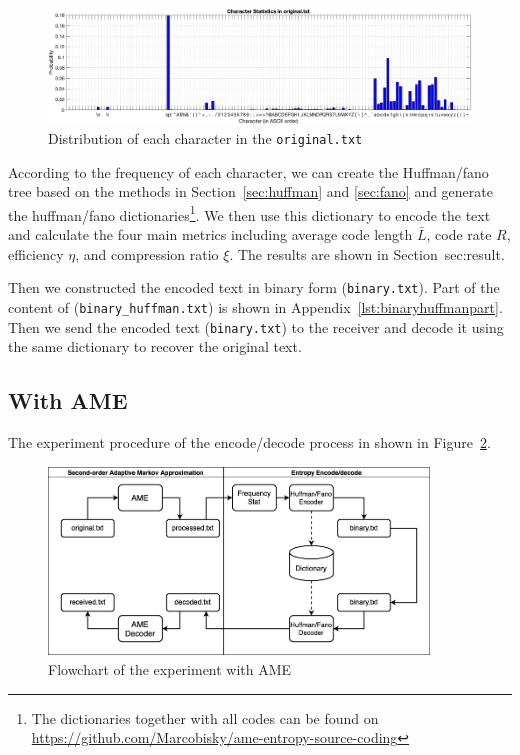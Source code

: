 \documentclass[12pt,twoside]{article}
\begin{document}
\begin{figure}[h!]
    \centering
    \includegraphics[width=\textwidth]{originalStat.png}
    \caption{Distribution of each character in the \texttt{original.txt}}
    \label{fig:originalStat}
\end{figure}

According to the frequency of each character, we can create the Huffman/fano tree based on the methods in Section~\ref{sec:huffman} and \ref{sec:fano} and generate the huffman/fano dictionaries\footnote{The dictionaries together with all codes can be found on \url{https://github.com/Marcobisky/ame-entropy-source-coding}}. We then use this dictionary to encode the text and calculate the four main metrics including average code length $\bar{L}$, code rate $R$, efficiency $\eta$, and compression ratio $\xi$. The results are shown in Section~{sec:result}. 

Then we constructed the encoded text in binary form (\texttt{binary.txt}). Part of the content of (\texttt{binary\_huffman.txt}) is shown in Appendix~\ref{lst:binaryhuffmanpart}. Then we send the encoded text (\texttt{binary.txt}) to the receiver and decode it using the same dictionary to recover the original text.



\subsection{With AME}

The experiment procedure of the encode/decode process in shown in Figure~\ref{fig:with-ame}.

\begin{figure}[h!]
    \centering
    \includegraphics[width=0.9\textwidth]{with-ame2.png}
    \caption{Flowchart of the experiment with AME}
    \label{fig:with-ame}
\end{figure}
\end{document}
